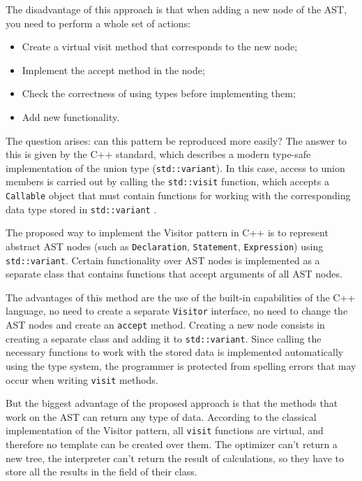 \documentclass[a4paper, 12pt]{article}
\begin{document}
	The disadvantage of this approach is that when adding a new node of the AST, you need to perform a whole set of actions:
	
	\begin{itemize}
		\item 
			Create a virtual visit method that corresponds to the new node;
		\item
			Implement the accept method in the node;
		\item
			Check the correctness of using types before implementing them;
		\item
			Add new functionality. 
	\end{itemize}
	
	The question arises: can this pattern be reproduced more easily? The answer to this is given by the C++ standard, which describes a modern type-safe implementation of the union type (\texttt{std::variant}). In this case, access to union members is carried out by calling the \texttt{std::visit} function, which accepts a \texttt{Callable} object that must contain functions for working with the corresponding data type stored in \texttt{std::variant} \cite{cpp}.
	
	The proposed way to implement the Visitor pattern in C++ is to represent abstract AST nodes (such as \texttt{Declaration}, \texttt{Statement}, \texttt{Expression}) using \texttt{std::variant}. Certain functionality over AST nodes is implemented as a separate class that contains functions that accept arguments of all AST nodes.
	
	The advantages of this method are the use of the built-in capabilities of the C++ language, no need to create a separate \texttt{Visitor} interface, no need to change the AST nodes and create an \texttt{accept} method. Creating a new node consists in creating a separate class and adding it to \texttt{std::variant}. Since calling the necessary functions to work with the stored data is implemented automatically using the type system, the programmer is protected from spelling errors that may occur when writing \texttt{visit} methods.
	
	But the biggest advantage of the proposed approach is that the methods that work on the AST can return any type of data. According to the classical implementation of the Visitor pattern, all \texttt{visit} functions are virtual, and therefore no template can be created over them. The optimizer can't return a new tree, the interpreter can't return the result of calculations, so they have to store all the results in the field of their class.
	
\end{document}
